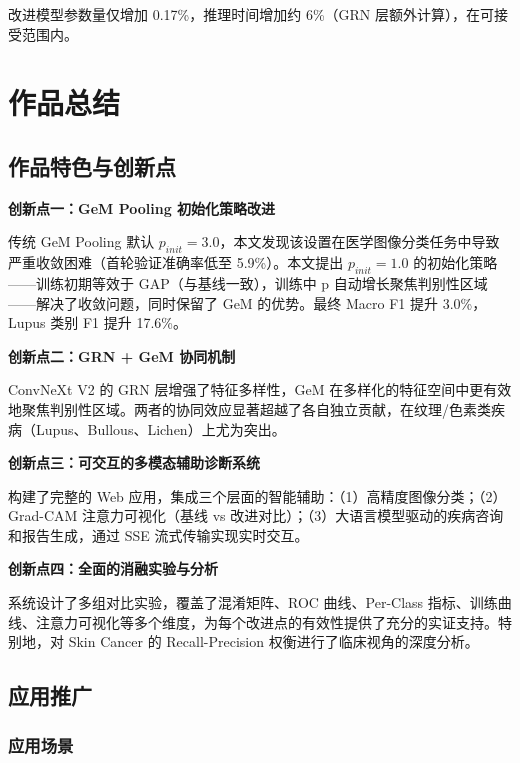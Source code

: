 \documentclass[12pt,a4paper]{report}
\begin{document}
改进模型参数量仅增加 0.17\%，推理时间增加约 6\%（GRN 层额外计算），在可接受范围内。

\chapter{作品总结}

\section{作品特色与创新点}

\textbf{创新点一：GeM Pooling 初始化策略改进}

传统 GeM Pooling 默认 $p_{init}=3.0$，本文发现该设置在医学图像分类任务中导致严重收敛困难（首轮验证准确率低至 5.9\%）。本文提出 $p_{init}=1.0$ 的初始化策略——训练初期等效于 GAP（与基线一致），训练中 p 自动增长聚焦判别性区域——解决了收敛问题，同时保留了 GeM 的优势。最终 Macro F1 提升 3.0\%，Lupus 类别 F1 提升 17.6\%。

\textbf{创新点二：GRN + GeM 协同机制}

ConvNeXt V2 的 GRN 层增强了特征多样性，GeM 在多样化的特征空间中更有效地聚焦判别性区域。两者的协同效应显著超越了各自独立贡献，在纹理/色素类疾病（Lupus、Bullous、Lichen）上尤为突出。

\textbf{创新点三：可交互的多模态辅助诊断系统}

构建了完整的 Web 应用，集成三个层面的智能辅助：（1）高精度图像分类；（2）Grad-CAM 注意力可视化（基线 vs 改进对比）；（3）大语言模型驱动的疾病咨询和报告生成，通过 SSE 流式传输实现实时交互。

\textbf{创新点四：全面的消融实验与分析}

系统设计了多组对比实验，覆盖了混淆矩阵、ROC 曲线、Per-Class 指标、训练曲线、注意力可视化等多个维度，为每个改进点的有效性提供了充分的实证支持。特别地，对 Skin Cancer 的 Recall-Precision 权衡进行了临床视角的深度分析。

\section{应用推广}

\subsection{应用场景}
\end{document}
